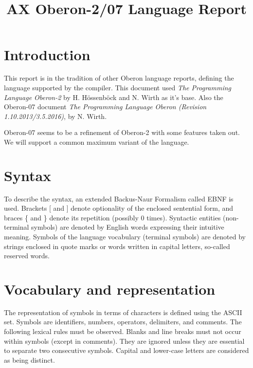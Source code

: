\documentclass[12pt]{article}
\title{AX Oberon-2/07 Language Report}
\begin{document}
    
\maketitle


\tableofcontents

\section{Introduction}

This report is in the tradition of other Oberon language reports, defining the language supported by the compiler. This document used {\em The Programming Language Oberon-2} by H. Hössenböck and N. Wirth as it's base. Also the Oberon-07 document {\em The Programming Language Oberon (Revision 1.10.2013/3.5.2016)}, by N. Wirth.

Oberon-07 seems to be a refinement of Oberon-2 with some features taken out. We will support a common maximum variant of the language.

\section{Syntax}

To describe the syntax, an extended Backus-Naur Formalism called EBNF is used. Brackets [ and ] denote optionality of the enclosed sentential form, and braces \{ and \} denote its repetition (possibly 0 times). Syntactic entities (non-terminal symbols) are denoted by English words expressing their intuitive meaning. Symbols of the language vocabulary (terminal symbols) are denoted by strings enclosed in quote marks or words written in capital letters, so-called reserved words.

\section{Vocabulary and representation}

The representation of symbols in terms of characters is defined using the ASCII set. Symbols are identifiers, numbers, operators, delimiters, and comments. The following lexical rules must be observed. Blanks and line breaks must not occur within symbols (except in comments). They are ignored unless they are essential to separate two consecutive symbols. Capital and lower-case letters are considered as being distinct.
\end{document}
